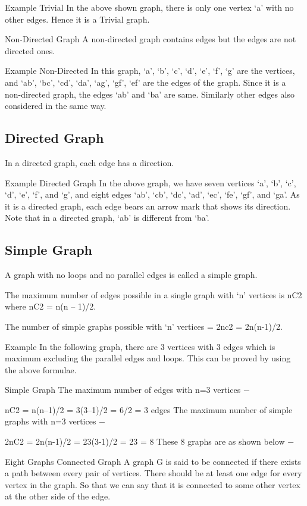 Example
Trivial
In the above shown graph, there is only one vertex ‘a’ with no other edges. Hence it is a Trivial graph.

Non-Directed Graph
A non-directed graph contains edges but the edges are not directed ones.

Example
Non-Directed
In this graph, ‘a’, ‘b’, ‘c’, ‘d’, ‘e’, ‘f’, ‘g’ are the vertices, and ‘ab’, ‘bc’, ‘cd’, ‘da’, ‘ag’, ‘gf’, ‘ef’ are the edges of the graph. Since it is a non-directed graph, the edges ‘ab’ and ‘ba’ are same. Similarly other edges also considered in the same way.

\subsection{Directed Graph}
In a directed graph, each edge has a direction.

Example
Directed Graph
In the above graph, we have seven vertices ‘a’, ‘b’, ‘c’, ‘d’, ‘e’, ‘f’, and ‘g’, and eight edges ‘ab’, ‘cb’, ‘dc’, ‘ad’, ‘ec’, ‘fe’, ‘gf’, and ‘ga’. As it is a directed graph, each edge bears an arrow mark that shows its direction. Note that in a directed graph, ‘ab’ is different from ‘ba’.

\subsection{Simple Graph}
A graph with no loops and no parallel edges is called a simple graph.

The maximum number of edges possible in a single graph with ‘n’ vertices is nC2 where nC2 = n(n – 1)/2.

The number of simple graphs possible with ‘n’ vertices = 2nc2 = 2n(n-1)/2.

Example
In the following graph, there are 3 vertices with 3 edges which is maximum excluding the parallel edges and loops. This can be proved by using the above formulae.

Simple Graph
The maximum number of edges with n=3 vertices −

nC2 = n(n–1)/2
   = 3(3–1)/2
   = 6/2
   = 3 edges
The maximum number of simple graphs with n=3 vertices −

2nC2 = 2n(n-1)/2
   = 23(3-1)/2
   = 23
   = 8
These 8 graphs are as shown below −

Eight Graphs
Connected Graph
A graph G is said to be connected if there exists a path between every pair of vertices. There should be at least one edge for every vertex in the graph. So that we can say that it is connected to some other vertex at the other side of the edge.

